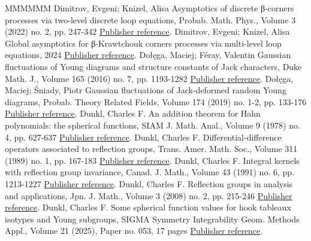 \begin{thebibliography}{MMMMMM}
 Dimitrov, Evgeni; Knizel, Alisa Asymptotics of discrete β-corners processes via two-level discrete loop equations, Probab. Math. Phys., Volume 3 (2022) no. 2, pp. 247-342 \href{https://alco.centre-mersenne.org/articles/10.5802/alco.451/#dimitrov2022asymptotics}{Publisher reference}.
 Dimitrov, Evgeni; Knizel, Alisa Global asymptotics for β-Krawtchouk corners processes via multi-level loop equations, 2024 \href{https://alco.centre-mersenne.org/articles/10.5802/alco.451/#dimitrov2024global}{Publisher reference}.
 Dołęga, Maciej; Féray, Valentin Gaussian fluctuations of Young diagrams and structure constants of Jack characters, Duke Math. J., Volume 165 (2016) no. 7, pp. 1193-1282 \href{https://alco.centre-mersenne.org/articles/10.5802/alco.451/#dolega2016gaussian}{Publisher reference}.
 Dołęga, Maciej; Śniady, Piotr Gaussian fluctuations of Jack-deformed random Young diagrams, Probab. Theory Related Fields, Volume 174 (2019) no. 1-2, pp. 133-176 \href{https://alco.centre-mersenne.org/articles/10.5802/alco.451/#dolega2019gaussian}{Publisher reference}.
 Dunkl, Charles F. An addition theorem for Hahn polynomials: the spherical functions, SIAM J. Math. Anal., Volume 9 (1978) no. 4, pp. 627-637 \href{https://alco.centre-mersenne.org/articles/10.5802/alco.451/#dunkl1978addition}{Publisher reference}.
 Dunkl, Charles F. Differential-difference operators associated to reflection groups, Trans. Amer. Math. Soc., Volume 311 (1989) no. 1, pp. 167-183 \href{https://alco.centre-mersenne.org/articles/10.5802/alco.451/#dunkl1989differential}{Publisher reference}.
 Dunkl, Charles F. Integral kernels with reflection group invariance, Canad. J. Math., Volume 43 (1991) no. 6, pp. 1213-1227 \href{https://alco.centre-mersenne.org/articles/10.5802/alco.451/#dunkl1991integral}{Publisher reference}.
 Dunkl, Charles F. Reflection groups in analysis and applications, Jpn. J. Math., Volume 3 (2008) no. 2, pp. 215-246 \href{https://alco.centre-mersenne.org/articles/10.5802/alco.451/#dunkl2008reflection}{Publisher reference}.
 Dunkl, Charles F. Some spherical function values for hook tableaux isotypes and Young subgroups, SIGMA Symmetry Integrability Geom. Methods Appl., Volume 21 (2025), Paper no. 053, 17 pages \href{https://alco.centre-mersenne.org/articles/10.5802/alco.451/#Dun25a}{Publisher reference}.

\end{thebibliography}
